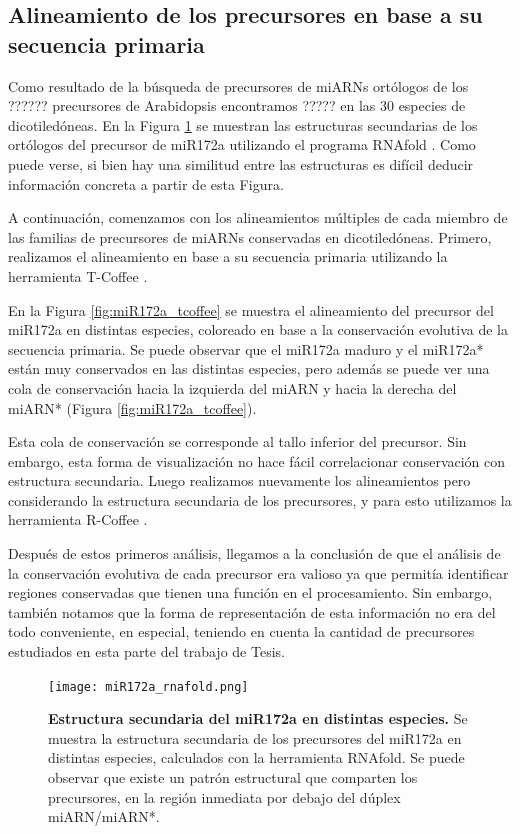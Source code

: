 \subsection{Alineamiento de los precursores en base a su secuencia primaria}

Como resultado de la búsqueda de precursores de miARNs ortólogos de los ?????? precursores de Arabidopsis encontramos ????? en las 30 especies de dicotiledóneas.
En la Figura \ref{fig:miR172a_rnafold} se muestran las estructuras secundarias de los ortólogos del precursor de miR172a utilizando el programa RNAfold \citep{pmid22115189}.
Como puede verse, si bien hay una similitud entre las estructuras es difícil deducir información concreta a partir de esta Figura.

A continuación, comenzamos con los alineamientos múltiples de cada miembro de las familias de precursores de miARNs conservadas en dicotiledóneas.
Primero, realizamos el alineamiento en base a su secuencia primaria utilizando la herramienta T-Coffee \citep{pmid10964570}.

En la Figura \ref{fig:miR172a_tcoffee} se muestra el alineamiento del precursor del miR172a en distintas especies, coloreado en base a la conservación evolutiva de la secuencia primaria.
Se puede observar que el miR172a maduro y el miR172a* están muy conservados en las distintas especies, pero además se puede ver una cola de conservación hacia la izquierda del miARN y hacia la derecha del miARN* (Figura \ref{fig:miR172a_tcoffee}).

Esta cola de conservación se corresponde al tallo inferior del precursor.
Sin embargo, esta forma de visualización no hace fácil correlacionar conservación con estructura secundaria.
Luego realizamos nuevamente los alineamientos pero considerando la estructura secundaria de los precursores, y para esto utilizamos la herramienta R-Coffee \citep{pmid18292307}.

Después de estos primeros análisis, llegamos a la conclusión de que el análisis de la conservación evolutiva de cada precursor era valioso ya que permitía identificar regiones conservadas que tienen una función en el procesamiento.
Sin embargo, también notamos que la forma de representación de esta información no era del todo conveniente, en especial, teniendo en cuenta la cantidad de precursores estudiados en esta parte del trabajo de Tesis.

\begin{landscape}
    \begin{figure}[htbp!] 
        \centering    
        \texttt{[image: miR172a\_rnafold.png]}
        \caption[Estructura secundaria del miR172a en distintas especies]{
        \textbf{Estructura secundaria del miR172a en distintas especies.}
        Se muestra la estructura secundaria de los precursores del miR172a en distintas especies, calculados con la herramienta RNAfold.
        Se puede observar que existe un patrón estructural que comparten los precursores, en la región inmediata por debajo del dúplex miARN/miARN*.
        }
        \label{fig:miR172a_rnafold}
    \end{figure}
\end{landscape}

